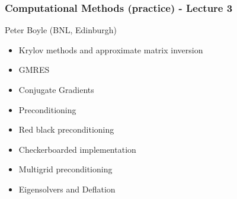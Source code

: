 \documentclass[pdf,ps,8pt]{beamer}
\begin{document}
\begin{frame}[fragile]\small\frametitle{  Computational Methods (practice) -  Lecture 3    }

  \begin{center}
 
  {\color{red} Peter Boyle} (BNL, Edinburgh)

  \begin{itemize}
  \item Krylov methods and approximate matrix inversion
  \item GMRES
  \item Conjugate Gradients
  \item Preconditioning
  \item Red black preconditioning
  \item Checkerboarded implementation
  \item Multigrid preconditioning
  \item Eigensolvers and Deflation
  \end{itemize}

\end{center}  
\end{frame}
\end{document}
